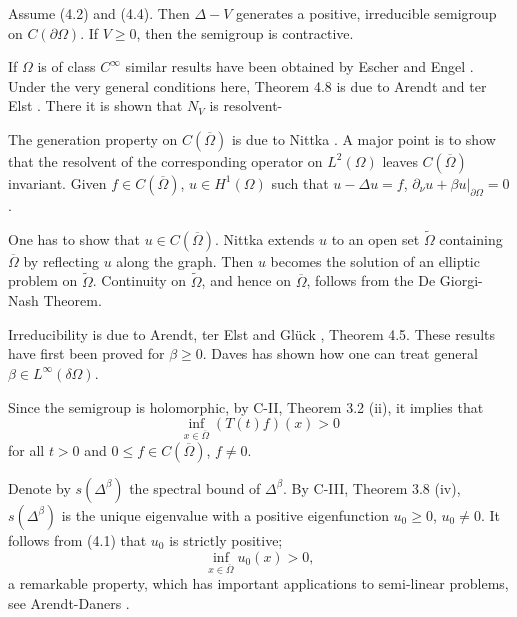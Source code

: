 

\begin{theorem}[4.4]
Assume (4.2) and (4.4). Then $\Delta - V$ generates a positive, irreducible semigroup on $C(\partial\Omega)$. If $V \geq 0$, then the semigroup is contractive.
\end{theorem}

If $\Omega$ is of class $C^\infty$ similar results have been obtained by Escher \cite{Es94} and Engel \cite{En03}. Under the very general conditions here, Theorem 4.8 is due to Arendt and ter Elst \cite{AtE20}. There it is shown that $N_V$ is resolvent-

The generation property on $C(\overline{\Omega})$ is due to Nittka \cite{Ni11}. A major point is to show that the resolvent of the corresponding operator on $L^2(\Omega)$ leaves $C(\overline{\Omega})$ invariant. Given $f \in C(\overline{\Omega})$, $u \in H^1(\Omega)$ such that $u - \Delta u = f$, $\partial_\nu u + \beta u|_{\partial\Omega} = 0$.

One has to show that $u \in C(\overline{\Omega})$. Nittka extends $u$ to an open set $\widetilde{\Omega}$ containing $\overline{\Omega}$ by reflecting $u$ along the graph. Then $u$ becomes the solution of an elliptic problem on $\widetilde{\Omega}$. Continuity on $\widetilde{\Omega}$, and hence on $\overline{\Omega}$, follows from the De Giorgi-Nash Theorem.

Irreducibility is due to Arendt, ter Elst and Glück \cite{AEG20}, Theorem 4.5.
These results have first been proved for $ \beta \geq 0 $.
Daves \cite{Dav09} has shown how one can treat general $ \beta \in L^{\infty}( \delta \Omega ) $.

Since the semigroup is holomorphic, by C-II, Theorem 3.2 (ii), it implies that
\begin{equation} \tag{4.1}
\inf_{x \in \overline{\Omega}} (T(t)f)(x) > 0
\end{equation}
for all $t > 0$ and $0 \leq f \in C(\overline{\Omega})$, $f \neq 0$.

Denote by $s(\Delta^\beta)$ the spectral bound of $\Delta^\beta$. 
By C-III, Theorem 3.8 (iv), $s(\Delta^\beta)$ is the unique eigenvalue with a positive eigenfunction $u_0 \geq 0$, $u_0 \neq 0$. 
It follows from (4.1) that $u_0$ is strictly positive; \ie
\[
	\inf_{x \in \overline{\Omega}} u_0(x) > 0,
\]
a remarkable property, which has important applications to semi-linear problems, see Arendt-Daners \cite{AD25}.

